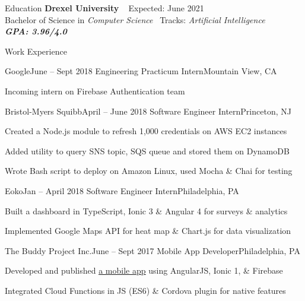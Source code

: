 \documentclass{resume} %
\begin{document}

\begin{rSection}{Education}
{\bf Drexel University}  
\hfill {Expected: June 2021} \\ 
Bachelor of Science in \textit{Computer Science }
\hfill  {Tracks: \textit{Artificial Intelligence}} \\
{\bf \em GPA: 3.96/4.0}

\end{rSection}


\begin{rSection}{Work Experience}
\begin{rSubsection}{Google}{June -- Sept 2018}
{Engineering Practicum Intern}{Mountain View, CA}
\item Incoming intern on Firebase Authentication team 
\end{rSubsection}


\begin{rSubsection}{Bristol-Myers Squibb}{April -- June 2018}
{Software Engineer Intern}{Princeton, NJ}
\item Created a Node.js module to refresh 1,000 credentials on AWS EC2 instances  
\item Added utility to query SNS topic, SQS queue and stored them on DynamoDB 
\item Wrote Bash script to deploy on Amazon Linux, used Mocha \& Chai for testing
\end{rSubsection}

\begin{rSubsection}{Eoko}{Jan -- April 2018}
{Software Engineer Intern}{Philadelphia, PA} 
\item Built a dashboard in TypeScript, Ionic 3 \& Angular 4 for surveys \& analytics 
\item Implemented Google Maps API for heat map \& Chart.js for data visualization 
\end{rSubsection}

\begin{rSubsection}{The Buddy Project Inc.}{June -- Sept 2017}
{Mobile App Developer}{Philadelphia, PA}
\item Developed and published  \href{https://play.google.com/store/apps/details?id=buddy.project.com}{\underline {a mobile app}}  using AngularJS, Ionic 1, \& Firebase 
\item Integrated Cloud Functions in JS (ES6) \& Cordova plugin for native features
\end{rSubsection}
\end{rSection}
\end{document}
